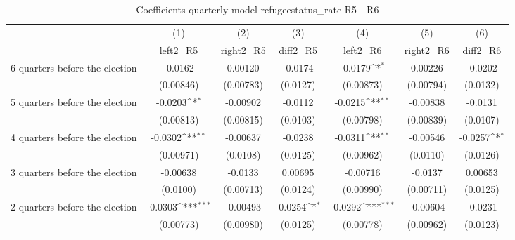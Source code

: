 \begin{table}[!ht]\centering \footnotesize
\def\sym#1{\ifmmode^{#1}\else\(^{#1}\)\fi}
\caption{Coefficients quarterly model refugeestatus\_rate R5 - R6}
\begin{tabular}{l*{6}{c}}
\hline\hline
                    &\multicolumn{1}{c}{(1)}&\multicolumn{1}{c}{(2)}&\multicolumn{1}{c}{(3)}&\multicolumn{1}{c}{(4)}&\multicolumn{1}{c}{(5)}&\multicolumn{1}{c}{(6)}\\
                    &\multicolumn{1}{c}{left2\_R5}&\multicolumn{1}{c}{right2\_R5}&\multicolumn{1}{c}{diff2\_R5}&\multicolumn{1}{c}{left2\_R6}&\multicolumn{1}{c}{right2\_R6}&\multicolumn{1}{c}{diff2\_R6}\\
\hline
 6 quarters before the election&     -0.0162         &     0.00120         &     -0.0174         &     -0.0179\sym{*}  &     0.00226         &     -0.0202         \\
                    &   (0.00846)         &   (0.00783)         &    (0.0127)         &   (0.00873)         &   (0.00794)         &    (0.0132)         \\
[1em]
 5 quarters before the election&     -0.0203\sym{*}  &    -0.00902         &     -0.0112         &     -0.0215\sym{**} &    -0.00838         &     -0.0131         \\
                    &   (0.00813)         &   (0.00815)         &    (0.0103)         &   (0.00798)         &   (0.00839)         &    (0.0107)         \\
[1em]
 4 quarters before the election&     -0.0302\sym{**} &    -0.00637         &     -0.0238         &     -0.0311\sym{**} &    -0.00546         &     -0.0257\sym{*}  \\
                    &   (0.00971)         &    (0.0108)         &    (0.0125)         &   (0.00962)         &    (0.0110)         &    (0.0126)         \\
[1em]
 3 quarters before the election&    -0.00638         &     -0.0133         &     0.00695         &    -0.00716         &     -0.0137         &     0.00653         \\
                    &    (0.0100)         &   (0.00713)         &    (0.0124)         &   (0.00990)         &   (0.00711)         &    (0.0125)         \\
[1em]
 2 quarters before the election&     -0.0303\sym{***}&    -0.00493         &     -0.0254\sym{*}  &     -0.0292\sym{***}&    -0.00604         &     -0.0231         \\
                    &   (0.00773)         &   (0.00980)         &    (0.0125)         &   (0.00778)         &   (0.00962)         &    (0.0123)         \\

\end{tabular}
\end{table}
